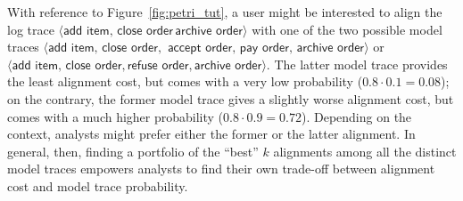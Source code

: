With reference to Figure~\ref{fig:petri_tut}, a user might be interested to align the log trace $\langle \textsf{add item},\,\textsf{close order}\,\textsf{archive order}\rangle$ with one of the two possible model traces $\langle \textsf{add item},\,\textsf{close order},$ $\textsf{accept order},\,\textsf{pay order},\,\textsf{archive order}\rangle$ or $\langle\textsf{add item},\,\textsf{close order}, \textsf{refuse order}, \textsf{archive order}\rangle$. The latter model trace provides the least alignment cost, but comes with a very low probability ($0.8 \cdot 0.1 = 0.08$); on the contrary, the former model trace gives a slightly worse alignment cost, but comes with a much higher probability ($0.8 \cdot 0.9 = 0.72$). Depending on the context, analysts might prefer either the former or the latter alignment. In general, then, finding a portfolio of the ``best'' $k$ alignments among all the distinct model traces empowers analysts to find their own trade-off between alignment cost and model trace probability.

